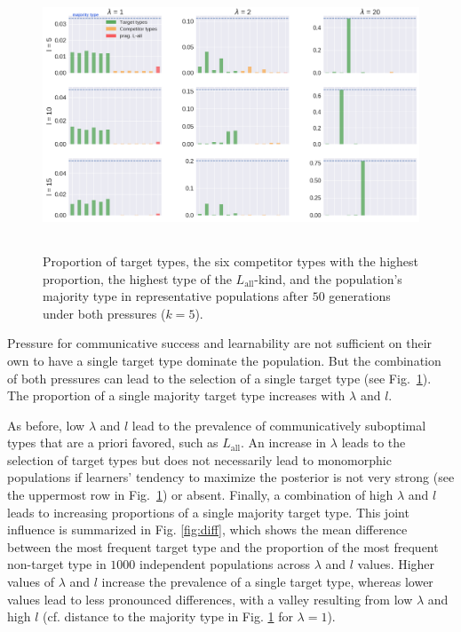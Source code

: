 \documentclass[a4paper, 11pt]{article}
\theoremstyle{Satz}
\newcommand{\mylang}[1]{\ensuremath{L_{\text{#1}}}\xspace} %
\newcommand{\Lall}{\mylang{all}}
\begin{document}
\begin{figure}[t]
\centering
\includegraphics[width=1\textwidth,height=8cm,keepaspectratio]{./plots/fig5}
\caption{Proportion of target types, the six competitor types with the highest proportion, the highest type of the $\Lall$-kind, and the population's majority type in representative populations after $50$ generations under both pressures ($k = 5$).}
\label{fig:rmd}
\end{figure}

Pressure for communicative success and learnability are not sufficient on their own to have a
single target type dominate the population. But the combination of both pressures can lead to
the selection of a single target type (see Fig.~\ref{fig:rmd}). The proportion of a single
majority target type increases with $\lambda$ and $l$.

As before, low $\lambda$ and $l$ lead to the prevalence of communicatively suboptimal types
that are a priori favored, such as $\Lall$. An increase in $\lambda$ leads to the selection of
target types but does not necessarily lead to monomorphic populations if learners' tendency to maximize the posterior is not very strong (see the uppermost row in Fig.~\ref{fig:rmd}) or absent. Finally, a combination of high $\lambda$ and $l$ leads to increasing proportions of a single majority target type. This joint
influence is summarized in Fig. \ref{fig:diff}, which shows the mean difference between the
most frequent target type and the proportion of the most frequent non-target type in $1000$ independent populations across $\lambda$ and $l$ values. Higher values
of $\lambda$ and $l$ increase the prevalence of a single target type, whereas lower values lead
to less pronounced differences, with a valley resulting from low $\lambda$ and high $l$
(cf. distance to the majority type in Fig. \ref{fig:rmd} for $\lambda = 1$).
\end{document}
